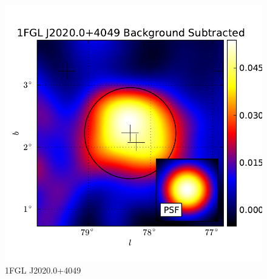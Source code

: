 \documentclass[preprint]{aastex}
\begin{document}
  \begin{figure}
    \begin{center}
      \includegraphics[type=pdf,ext=.pdf,read=.pdf]{source_plots/source_1FGL_J2020.0+4049}
    \end{center}
    \caption{
    1FGL J2020.0+4049
    }
  \end{figure}
\end{document}
